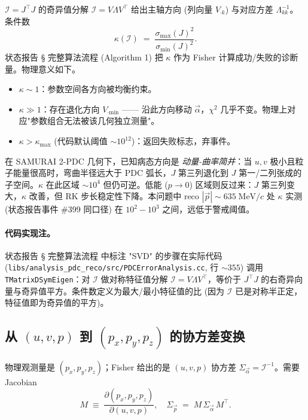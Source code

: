 $\mathcal I=J^\top J$ 的奇异值分解 $\mathcal I=V\Lambda V^\top$ 给出主轴方向 (列向量 $V_{\cdot k}$) 与对应方差 $\Lambda_{kk}^{-1}$。条件数
\begin{equation}
  \kappa(\mathcal I) \;=\;\frac{\sigma_\mathrm{max}(J)^2}{\sigma_\mathrm{min}(J)^2}.
  \label{eq:partIa:fisher:cond}
\end{equation}
状态报告 \StatusReport § 完整算法流程 (Algorithm 1) 把 $\kappa$ 作为 Fisher 计算成功/失败的诊断量。物理意义如下。

\begin{itemize}[nosep]
  \item $\kappa\sim 1$：参数空间各方向被均衡约束。
  \item $\kappa\gg 1$：存在退化方向 $V_{\cdot\mathrm{min}}$ —— 沿此方向移动 $\vec\alpha$，$\chi^2$ 几乎不变。物理上对应"参数组合无法被该几何独立测量"。
  \item $\kappa>\kappa_\mathrm{max}$ (代码默认阈值 $\sim 10^{12}$)：返回失败标志，弃事件。
\end{itemize}

在 SAMURAI 2-PDC 几何下，已知病态方向是 \emph{动量-曲率简并}：当 $u,v$ 极小且粒子能量很高时，弯曲半径远大于 PDC 弧长，$J$ 第三列退化到 $J$ 第一/二列张成的子空间。$\kappa$ 在此区域 $\sim 10^4$ 但仍可逆。低能 ($p\to 0$) 区域则反过来：$J$ 第三列变大，$\kappa$ 改善，但 RK 步长稳定性下降。本问题中 reco $|\vec p|\sim 635\;\mathrm{MeV}/c$ 处 $\kappa$ 实测 (状态报告事件 \#399 同口径) 在 $10^2-10^3$ 之间，远低于警戒阈值。

\paragraph{代码实现注。} 状态报告 § 完整算法流程 中标注 "SVD" 的步骤在实际代码 (\texttt{libs/analysis\_pdc\_reco/src/PDCErrorAnalysis.cc}, 行 $\sim 355$) 调用 \texttt{TMatrixDSymEigen}：对 $\mathcal I$ 做对称特征值分解 $\mathcal I=V\Lambda V^\top$，等价于 $J^\top J$ 的右奇异向量与奇异值平方。条件数定义为最大/最小特征值的比 (因为 $\mathcal I$ 已是对称半正定，特征值即为奇异值的平方)。

\subsection{从 $(u,v,p)$ 到 $(p_x,p_y,p_z)$ 的协方差变换}
\label{sec:partIa:fisher:momentum}

物理观测量是 $(p_x,p_y,p_z)$；Fisher 给出的是 $(u,v,p)$ 协方差 $\Sigma_{\vec\alpha}=\mathcal I^{-1}$。需要 Jacobian
\begin{equation}
  M \;\equiv\;\frac{\partial(p_x,p_y,p_z)}{\partial(u,v,p)},\quad
  \Sigma_{\vec p}\;=\;M\,\Sigma_{\vec\alpha}\,M^\top.
  \label{eq:partIa:fisher:Sp}
\end{equation}

